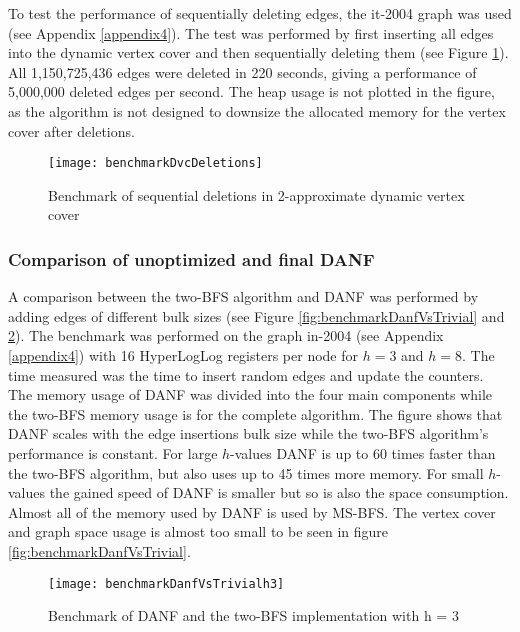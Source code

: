To test the performance of sequentially deleting edges, the it-2004 graph was used (see Appendix \ref{appendix4}). The test was performed by first inserting all edges into the dynamic vertex cover and then sequentially deleting them (see Figure \ref{fig:benchmarkDvcDeletions}). All 1,150,725,436 edges were deleted in 220 seconds, giving a performance of 5,000,000 deleted edges per second. The heap usage is not plotted in the figure, as the algorithm is not designed to downsize the allocated memory for the vertex cover after deletions. 

\begin{figure}[h]
\centering
\texttt{[image: benchmarkDvcDeletions]}    
\captionsetup{justification=centering}
\caption {Benchmark of sequential deletions in 2-approximate dynamic vertex cover}
\label{fig:benchmarkDvcDeletions}
\end{figure}



\subsubsection{Comparison of unoptimized and final DANF}
A comparison between the two-BFS algorithm and DANF was performed by adding edges of different bulk sizes (see Figure \ref{fig:benchmarkDanfVsTrivial} and \ref{fig:benchmarkDanfVsTrivialh3}). The benchmark was performed on the graph in-2004 (see Appendix \ref{appendix4})  with 16 HyperLogLog registers per node for $h = 3$ and $h = 8$. The time measured was the time to insert random edges and update the counters. The memory usage of DANF was divided into the four main components while the two-BFS memory usage is for the complete algorithm. The figure shows that DANF scales with the edge insertions bulk size while the two-BFS algorithm's performance is constant. For large $h$-values DANF is up to 60 times faster than the two-BFS algorithm, but also uses up to 45 times more memory. For small $h$-values the gained speed of DANF is smaller but so is also the space consumption. Almost all of the memory used by DANF is used by MS-BFS. The vertex cover and graph space usage is almost too small to be seen in figure \ref{fig:benchmarkDanfVsTrivial}. 

\begin{figure}[h]
\centering
\texttt{[image: benchmarkDanfVsTrivialh3]}    
\captionsetup{justification=centering}
\caption {Benchmark of DANF and the two-BFS implementation with h = 3}
\label{fig:benchmarkDanfVsTrivialh3}
\end{figure}

